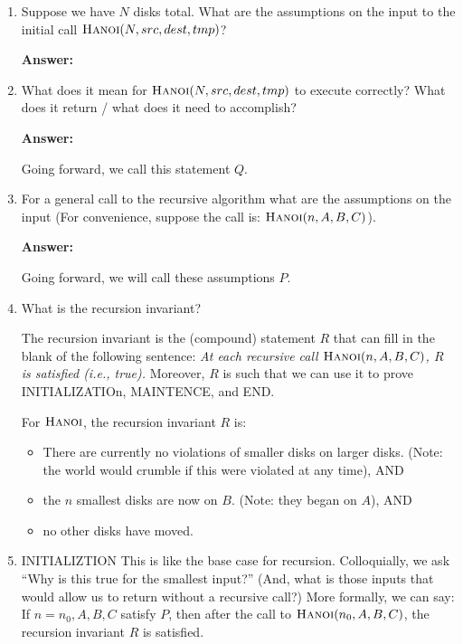 \documentclass{article}
\newcommand{\answer}{\textbf{Answer:}\vspace{1.8in}}
\begin{document}
\begin{enumerate}
    \item Suppose we have $N$ disks total. What are the assumptions on the input
        to the initial call $\textsc{Hanoi}(N,src,dest,tmp)$?

        \answer

    \item What does it mean for $\textsc{Hanoi}(N,src,dest,tmp)$ to execute
        correctly? What does it return / what does it need to accomplish?

        \answer

        Going forward, we call this statement $Q$.

    \pagebreak
    \item For a general call to the recursive algorithm what are the assumptions on the input
        (For convenience, suppose the call is: $\textsc{Hanoi}(n,A,B,C)$).

        \answer

        Going forward, we will call these assumptions $P$.

    \item What is the recursion invariant?

        The recursion invariant is the (compound) statement $R$ that can fill in
        the blank of the following sentence:
        \emph{At each recursive call $\textsc{Hanoi}(n,A,B,C)$,
        $R$ is satisfied (i.e., true).}  Moreover, $R$ is such that we can use
        it to prove INITIALIZATIOn, MAINTENCE, and END.

        For $\textsc{Hanoi}$, the recursion invariant $R$ is:
        \begin{itemize}
            \item There are currently no violations of smaller disks on larger
                disks. (Note: the world would crumble if this were violated at
                any time), AND
            \item the $n$ smallest disks are now on $B$. (Note: they began on
                $A$), AND
            \item no other disks have moved.
        \end{itemize}

    \item INITIALIZTION This is like the base case for recursion.  Colloquially,
        we ask ``Why is this
        true for the smallest input?'' (And, what is those inputs that
        would allow us to return without a recursive call?)  More formally, we
        can say: If $n=n_0,A,B,C$ satisfy $P$, then after the call to
        $\textsc{Hanoi}(n_0,A,B,C)$, the recursion invariant $R$ is satisfied.


\end{enumerate}
\end{document}
